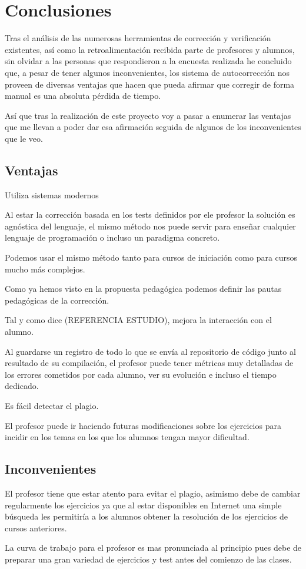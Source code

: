 \chapter{Conclusiones}

Tras el análisis de las numerosas herramientas de corrección y verificación existentes, así como la retroalimentación recibida parte de profesores y alumnos, sin olvidar a las personas que respondieron a la encuesta realizada he concluido que, a pesar de tener algunos inconvenientes, los sistema de autocorrección nos proveen de diversas ventajas que hacen que pueda afirmar que corregir de forma manual es una absoluta pérdida de tiempo.

\bigskip
Así que tras la realización de este proyecto voy a pasar a enumerar las ventajas que me llevan a poder dar esa afirmación seguida de algunos de los inconvenientes que le veo.

\section{Ventajas}

Utiliza sistemas modernos

Al estar la corrección basada en los tests definidos por ele profesor la solución es agnóstica del lenguaje, el mismo método nos puede servir para enseñar cualquier lenguaje de programación o incluso un paradigma concreto.

Podemos usar el mismo método tanto para cursos de iniciación como para cursos mucho más complejos.

Como ya hemos visto en la propuesta pedagógica podemos definir las pautas pedagógicas de la corrección.

Tal y como dice (REFERENCIA ESTUDIO), mejora la interacción con el alumno.

Al guardarse un registro de todo lo que se envía al repositorio de código junto al resultado de su compilación, el profesor puede tener métricas muy detalladas de los errores cometidos por cada alumno, ver su evolución e incluso el tiempo dedicado.

Es fácil detectar el plagio.

El profesor puede ir haciendo futuras modificaciones sobre los ejercicios para incidir en los temas en los que los alumnos tengan mayor dificultad.


\section{Inconvenientes}

El profesor tiene que estar atento para evitar el plagio, asimismo debe de cambiar regularmente los ejercicios ya que al estar disponibles en Internet una simple búsqueda les permitiría a los alumnos obtener la resolución de los ejercicios de cursos anteriores.

La curva de trabajo para el profesor es mas pronunciada al principio pues debe de preparar una gran variedad de ejercicios y test antes del comienzo de las clases.



